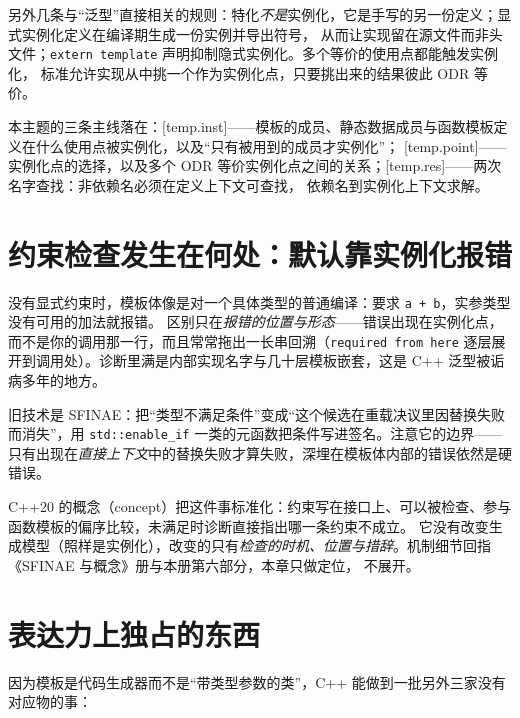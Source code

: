 \documentclass[12pt,a4paper,fontset=fandol]{ctexbook}
\newcommand{\cpp}[1]{C++#1}
\newcommand{\kw}[1]{\texttt{#1}}
\begin{document}
另外几条与“泛型”直接相关的规则：特化\emph{不是}实例化，它是手写的另一份定义；显式实例化定义在编译期生成一份实例并导出符号，
从而让实现留在源文件而非头文件；\kw{extern template} 声明抑制隐式实例化。多个等价的使用点都能触发实例化，
标准允许实现从中挑一个作为实例化点，只要挑出来的结果彼此 ODR 等价。

\begin{stdbox}[title={标准文本的说法}]
本主题的三条主线落在：[temp.inst]——模板的成员、静态数据成员与函数模板定义在什么使用点被实例化，以及“只有被用到的成员才实例化”；
[temp.point]——实例化点的选择，以及多个 ODR 等价实例化点之间的关系；[temp.res]——两次名字查找：非依赖名必须在定义上下文可查找，
依赖名到实例化上下文求解。
\end{stdbox}

\section{约束检查发生在何处：默认靠实例化报错}

没有显式约束时，模板体像是对一个具体类型的普通编译：要求 \kw{a + b}，实参类型没有可用的加法就报错。
区别只在\emph{报错的位置与形态}——错误出现在实例化点，而不是你的调用那一行，而且常常拖出一长串回溯（\kw{required from here}
逐层展开到调用处）。诊断里满是内部实现名字与几十层模板嵌套，这是 \cpp{} 泛型被诟病多年的地方。

旧技术是 SFINAE：把“类型不满足条件”变成“这个候选在重载决议里因替换失败而消失”，用 \kw{std::enable\_if}
一类的元函数把条件写进签名。注意它的边界——只有出现在\emph{直接上下文}中的替换失败才算失败，深埋在模板体内部的错误依然是硬错误。

\cpp{20} 的概念（concept）把这件事标准化：约束写在接口上、可以被检查、参与函数模板的偏序比较，未满足时诊断直接指出哪一条约束不成立。
它没有改变生成模型（照样是实例化），改变的只有\emph{检查的时机、位置与措辞}。机制细节回指《SFINAE 与概念》册与本册第六部分，本章只做定位，
不展开。

\section{表达力上独占的东西}

因为模板是代码生成器而不是“带类型参数的类”，\cpp{} 能做到一批另外三家没有对应物的事：
\end{document}
